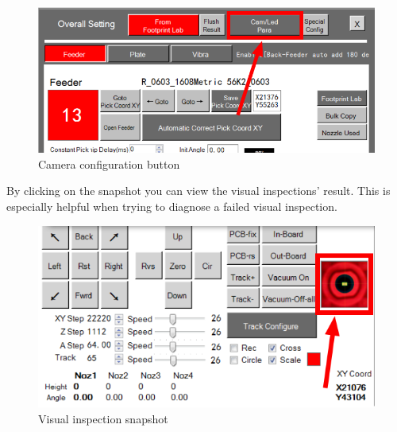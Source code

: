 \documentclass[a4paper,10pt]{report}
\begin{document}
 \begin{figure}[!htb]
 \centering
 \includegraphics[width=1\textwidth]{images/scrot27.png}
 \caption{Camera configuration button}
\end{figure}
By clicking on the snapshot you can view the visual inspections' result.
This is especially helpful when trying to diagnose a failed visual inspection.
 \begin{figure}[!htb]
 \centering
 \includegraphics[width=1\textwidth]{images/scrot28.png}
 \caption{Visual inspection snapshot}
\end{figure}
\newpage
\end{document}
